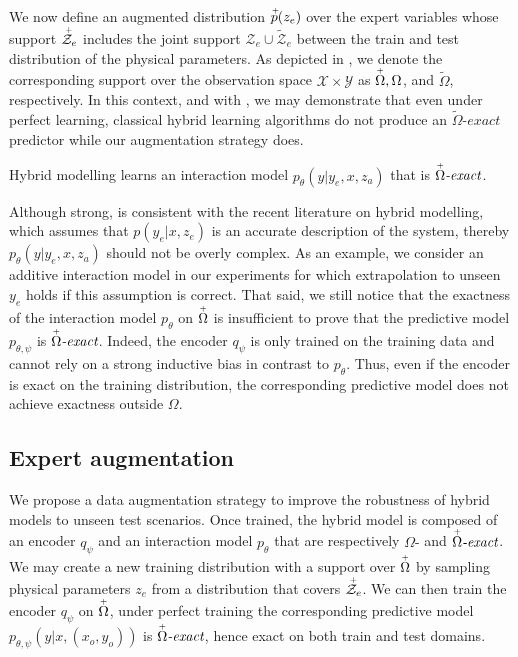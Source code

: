 We now define an augmented distribution $\accentset{+}{p}(z_e)$ over the expert variables whose support $\accentset{+}{\mathcal{Z}}_e$ includes the joint support $\mathcal{Z}_e \cup \tilde{\mathcal{Z}}_e$ between the train and test distribution of the physical parameters. As depicted in , we denote the corresponding support over the observation space $\mathcal{X} \times \mathcal{Y}$ as $\accentset{+}{\Omega}, \Omega$, and $\tilde{\Omega}$, respectively. In this context, and with \textbf{}, we may demonstrate that even under perfect learning, classical hybrid learning algorithms do not produce an $\tilde{\Omega}\textit{-exact}$ predictor while our augmentation strategy does.
\begin{hyp} \label{hyp:first}
Hybrid modelling learns an interaction model $p_\theta(y|y_e, x, z_a)$ that is $\accentset{+}{\Omega}\textit{-exact}$.
\end{hyp}
Although strong, \textbf{} is consistent with the recent literature on hybrid modelling, which assumes that $p(y_e|x, z_e)$ is an accurate description of the system, thereby $p_\theta(y|y_e, x, z_a)$ should not be overly complex. As an example, we consider an additive interaction model in our experiments for which extrapolation to unseen $y_e$ holds if this assumption is correct. That said, we still notice that the exactness of the interaction model $p_\theta$ on $\accentset{+}{\Omega}$ is insufficient to prove that the predictive model $p_{\theta, \psi}$ is $\accentset{+}{\Omega}\textit{-exact}$. Indeed, the encoder $q_\psi$ is only trained on the training data and cannot rely on a strong inductive bias in contrast to $p_\theta$. Thus, even if the encoder is exact on the training distribution, the corresponding predictive model does not achieve exactness outside $\Omega$.

\subsection{Expert augmentation}
We propose a data augmentation strategy to improve the robustness of hybrid models to unseen test scenarios. Once trained, the hybrid model is composed of an encoder $q_\psi$ and an interaction model $p_\theta$ that are respectively $\Omega\textit{-}$ and $\accentset{+}{\Omega}\textit{-exact}$. We may create a new training distribution with a support over $\accentset{+}{\Omega}$ by sampling physical parameters $z_e$ from a distribution that covers $\accentset{+}{\mathcal{Z}}_e$. We can then train the encoder $q_\psi$ on $\accentset{+}{\Omega}$, under perfect training the corresponding predictive model $p_{\theta, \psi}(y|x, (x_o, y_o))$ is $\accentset{+}{\Omega}\textit{-exact}$, hence exact on both train and test domains.

